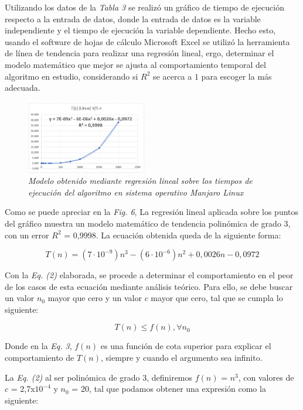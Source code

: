 \documentclass[11pt, twocolumn]{llncs}
\begin{document}
Utilizando los datos de la \textit{Tabla 3} se realizó un gráfico de tiempo de ejecución respecto a la entrada de datos, donde la entrada de datos es la variable independiente y el tiempo de ejecución la variable dependiente. Hecho esto, usando el software de hojas de cálculo Microsoft Excel se utilizó la herramienta de línea de tendencia para realizar una regresión lineal, ergo, determinar el modelo matemático que mejor se ajusta al comportamiento temporal del algoritmo en estudio, considerando si $R^2$ se acerca a $1$ para escoger la más adecuada.

\begin{figure}[H]
\caption{\textit{\label{fig:grafico4}Modelo obtenido mediante regresión lineal sobre los tiempos de ejecución del algoritmo en sistema operativo Manjaro Linux}}
\centering
\includegraphics[width=0.47\textwidth]{imagenes/grafico_4.png}
\end{figure}

Como se puede apreciar en la \textit{Fig. 6}, La regresión lineal aplicada sobre los puntos del gráfico muestra un modelo matemático de tendencia polinómica de grado 3, con un error $R^{2}$ = 0,9998. La ecuación obtenida queda de la siguiente forma:

{
\scriptsize
\begin{equation}
{T(n)=(7 \cdot 10^{-9})n^3-(6 \cdot 10^{-6})n^2+0,0026n-0,0972}
\end{equation}
}

Con la \textit{Eq. (2)} elaborada, se procede a determinar el comportamiento en el peor de los casos de esta ecuación mediante análisis teórico. Para ello, se debe buscar un valor $n_0$ mayor que cero y un valor $c$ mayor que cero, tal que se cumpla lo siguiente:

\begin{equation}
T(n) \leq f(n), \forall n_0
\end{equation}

Donde en la \textit{Eq. 3}, $f(n)$ es una función de cota superior para explicar el comportamiento de $T(n)$, siempre y cuando el argumento sea infinito.

La \textit{Eq. (2)} al ser polinómica de grado 3, definiremos $f(n)$ = $n^3$, con valores de $c$ = 2,7x$10^{-4}$ y $n_{0}$ = 20, tal que podamos obtener una expresión como la siguiente:
\end{document}
